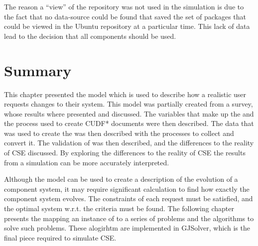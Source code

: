 The reason a ``view'' of the repository was not used in the simulation is due to the fact that no data-source could be found 
that saved the set of packages that could be viewed in the Ubuntu repository at a particular time.
This lack of data lead to the decision that all components should be used.

\section{Summary}
This chapter presented the \usermodel model which is used to describe how a realistic user requests changes to their system.
This model was partially created from a survey, whose results where presented and discussed.
The variables that make up the \usermodel and the process used to create CUDF* documents were then described.
The data that was used to create the \usermodel was then described with the processes to collect and convert it.
The validation of \usermodel was then described, and the differences to the reality of CSE discussed.
By exploring the differences to the reality of CSE the results from a simulation can be more accurately interpreted.

Although the \usermodel model can be used to create a description of the evolution of a component system, it may require significant calculation to find how exactly the component system evolves.
The constraints of each request must be satisfied, and the optimal system w.r.t. the criteria must be found.
The following chapter presents the mapping an instance of \modelname to a series of problems and the algorithms to solve such problems.
These alogirhtm are implemented in GJSolver, which is the final piece required to simulate CSE.


